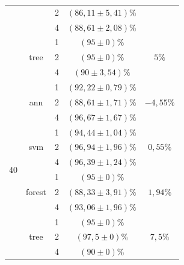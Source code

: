 \begin{table}[]
\begin{tabular}{|c|c|c|c|c|}
                      &                         & 2                & $ (86,11 \pm 5,41) \% $   &\\ \cline{3-4} 
                      &                         & 4                & $ (88,61 \pm 2,08) \% $  & \\ \cline{2-5} 
                      & \multirow{3}{*}{tree}   & 1                & $ (95 \pm 0) \%  $       & \multirow{3}{*}{$5\%$} \\ \cline{3-4} 
                      &                         & 2                & $ (95 \pm 0) \%  $       &\\ \cline{3-4} 
                      &                         & 4                & $ (90 \pm  3,54) \% $     & \\ \hline
\multirow{12}{*}{40}  & \multirow{3}{*}{ann}    & 1                & $ (92,22 \pm 0,79) \% $   & \multirow{3}{*}{$-4,55  \%$} \\ \cline{3-4} 
                      &                         & 2                & $ (88,61 \pm 1,71) \% $   &\\ \cline{3-4} 
                      &                         & 4                & $ (96,67 \pm 1,67) \% $  & \\ \cline{2-5} 
                      & \multirow{3}{*}{svm}    & 1                & $ (94,44 \pm 1,04) \% $   & \multirow{3}{*}{$0,55$\%} \\ \cline{3-4} 
                      &                         & 2                & $ (96,94 \pm 1,96) \% $  & \\ \cline{3-4} 
                      &                         & 4                & $ (96,39 \pm 1,24) \% $   &\\ \cline{2-5} 
                      & \multirow{3}{*}{forest} & 1                & $ (95 \pm 0) \% $        & \multirow{3}{*}{$1,94$\%} \\ \cline{3-4} 
                      &                         & 2                & $ (88,33 \pm 3,91) \% $   &\\ \cline{3-4} 
                      &                         & 4                & $ (93,06 \pm 1,96) \% $   &\\ \cline{2-5} 
                      & \multirow{3}{*}{tree}   & 1                & $ (95 \pm 0) \% $         & \multirow{3}{*}{$7,5\%$} \\ \cline{3-4} 
                      &                         & 2                & $ (97,5 \pm 0) \% $      &\\ \cline{3-4} 
                      &                         & 4                & $ (90 \pm 0) \%   $     & \\ \hline

\end{tabular}
\end{table}
